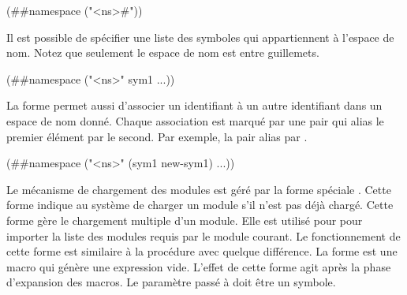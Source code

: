 \begin{center}
  \begin{mplisting}{0.8}
(##namespace ("<ns>#"))
\end{mplisting}
\end{center}

Il est possible de spécifier une liste des symboles qui appartiennent à
l'espace de nom. Notez que seulement le espace de nom est entre guillemets.

\begin{center}
  \begin{mplisting}{0.8}
(##namespace ("<ns>" sym1 ...))
\end{mplisting}
\end{center}

La forme  permet aussi d'associer un identifiant à un
autre identifiant dans un espace de nom donné. Chaque association est marqué
par une pair qui alias le premier élément par le second. Par exemple, la pair
 alias  par .

\begin{center}
  \begin{mplisting}{0.6}
(##namespace ("<ns>" (sym1 new-sym1) ...))
\end{mplisting}
\end{center}




Le mécanisme de chargement des modules est géré par la forme spéciale
. Cette forme indique au système de charger un module
s'il n'est pas déjà chargé. Cette forme gère le chargement multiple d'un
module. Elle est utilisé pour pour importer la liste des modules requis par le
module courant.  Le fonctionnement de cette forme est similaire à la procédure
 avec quelque différence. La forme  est
une macro qui génère une expression vide. L'effet de cette forme agit après la
phase d'expansion des macros. Le paramètre passé à 
doit être un symbole.


